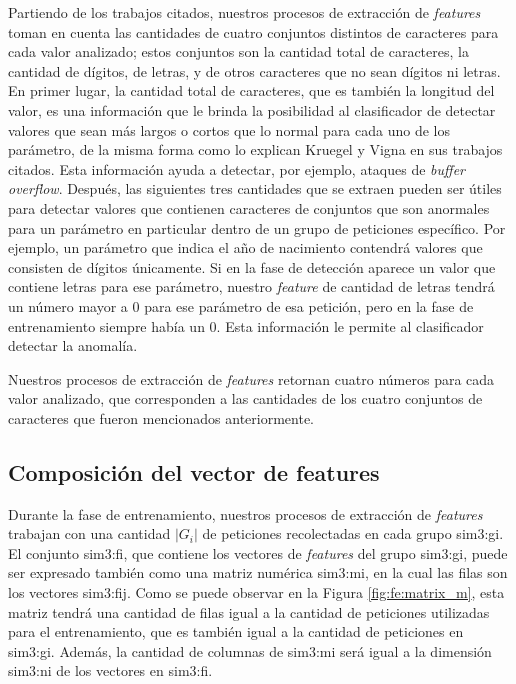 Partiendo de los trabajos citados, nuestros procesos de extracción de
\textit{features} toman en cuenta las cantidades de cuatro conjuntos
distintos de caracteres para cada valor analizado; estos conjuntos son
la cantidad total de caracteres, la cantidad de dígitos, de letras, y
de otros caracteres que no sean dígitos ni letras.
En primer lugar, la cantidad total de caracteres, que es también la
longitud del valor, es una información que le brinda la posibilidad al
clasificador de detectar valores que sean más largos
o cortos que lo normal para cada uno de los parámetro, de la misma forma
como lo explican Kruegel y Vigna en sus trabajos citados. Esta información
ayuda a detectar, por ejemplo, ataques de \textit{buffer overflow}.
Después, las siguientes tres cantidades que se extraen pueden ser útiles
para detectar valores que contienen caracteres de conjuntos que son
anormales para un parámetro en particular dentro de un grupo de peticiones
específico.
Por ejemplo, un parámetro que indica el año de nacimiento contendrá
valores que consisten de dígitos únicamente. Si en la fase de detección
aparece un valor que contiene letras para ese parámetro, nuestro
\textit{feature} de cantidad de letras tendrá un número mayor a 0 para
ese parámetro de esa petición, pero en la fase de entrenamiento siempre
había un 0. Esta información le permite al clasificador detectar la
anomalía.

Nuestros procesos de extracción de \textit{features} retornan cuatro
números para cada valor analizado, que corresponden a las cantidades de
los cuatro conjuntos de caracteres que fueron mencionados anteriormente.


\subsection{Composición del vector de features}

Durante la fase de entrenamiento, nuestros procesos de extracción de
\textit{features} trabajan con una cantidad $\lvert G_{i} \rvert$ de
peticiones recolectadas en cada grupo \gls{sim3:gi}.
El conjunto \gls{sim3:fi}, que contiene los vectores de \textit{features}
del grupo \gls{sim3:gi}, puede ser expresado también como una matriz
numérica \gls{sim3:mi}, en la cual las filas son los vectores \gls{sim3:fij}.
Como se puede observar en la Figura \ref{fig:fe:matrix_m}, esta matriz
tendrá una cantidad de filas igual a la cantidad de peticiones
utilizadas para el entrenamiento, que es también igual a la cantidad de
peticiones en \gls{sim3:gi}. Además, la cantidad de columnas de
\gls{sim3:mi} será igual a la dimensión \gls{sim3:ni} de los vectores
en \gls{sim3:fi}.

